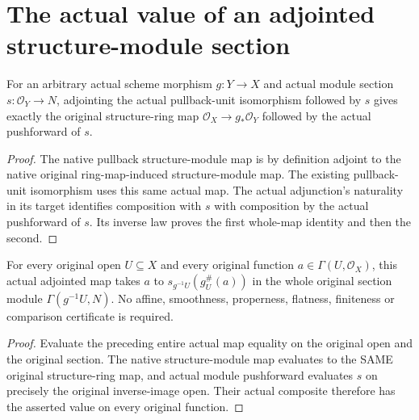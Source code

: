 \section{The actual value of an adjointed structure-module section}

\begin{lemma}\label{sc0-pushforward-unit-sections:map}
\leanok
For an arbitrary actual scheme morphism $g:Y\to X$ and actual module section $s:\mathcal O_Y\to N$, adjointing the actual pullback-unit isomorphism followed by $s$ gives exactly the original structure-ring map $\mathcal O_X\to g_*\mathcal O_Y$ followed by the actual pushforward of $s$.
\end{lemma}
\begin{proof}
The native pullback structure-module map is by definition adjoint to the native original ring-map-induced structure-module map. The existing pullback-unit isomorphism uses this same actual map. The actual adjunction's naturality in its target identifies composition with $s$ with composition by the actual pushforward of $s$. Its inverse law proves the first whole-map identity and then the second.
\end{proof}

\begin{theorem}\label{sc0-pushforward-unit-sections:value}
\leanok
{}
For every original open $U\subseteq X$ and every original function $a\in\Gamma(U,\mathcal O_X)$, this actual adjointed map takes $a$ to $s_{g^{-1}U}(g^\#_U(a))$ in the whole original section module $\Gamma(g^{-1}U,N)$. No affine, smoothness, properness, flatness, finiteness or comparison certificate is required.
\end{theorem}
\begin{proof}
Evaluate the preceding entire actual map equality on the original open and the original section. The native structure-module map evaluates to the SAME original structure-ring map, and actual module pushforward evaluates $s$ on precisely the original inverse-image open. Their actual composite therefore has the asserted value on every original function.
\end{proof}
